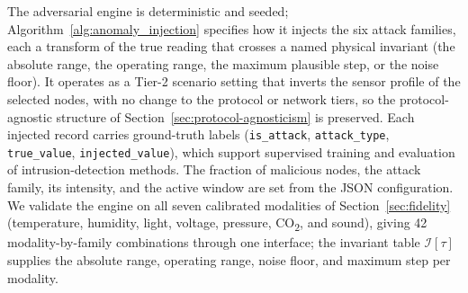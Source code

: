 \documentclass[jsan,article,submit,moreauthors,pdftex]{Definitions/mdpi}
\begin{document}
The adversarial engine is deterministic and seeded; Algorithm~\ref{alg:anomaly_injection} specifies how it injects the six attack families, each a transform of the true reading that crosses a named physical invariant (the absolute range, the operating range, the maximum plausible step, or the noise floor). It operates as a Tier-2 scenario setting that inverts the sensor profile of the selected nodes, with no change to the protocol or network tiers, so the protocol-agnostic structure of Section~\ref{sec:protocol-agnosticism} is preserved. Each injected record carries ground-truth labels (\texttt{is\_attack}, \texttt{attack\_type}, \texttt{true\_value}, \texttt{injected\_value}), which support supervised training and evaluation of intrusion-detection methods. The fraction of malicious nodes, the attack family, its intensity, and the active window are set from the JSON configuration. We validate the engine on all seven calibrated modalities of Section~\ref{sec:fidelity} (temperature, humidity, light, voltage, pressure, CO\textsubscript{2}, and sound), giving 42 modality-by-family combinations through one interface; the invariant table $\mathcal{I}[\tau]$ supplies the absolute range, operating range, noise floor, and maximum step per modality.
\end{document}

